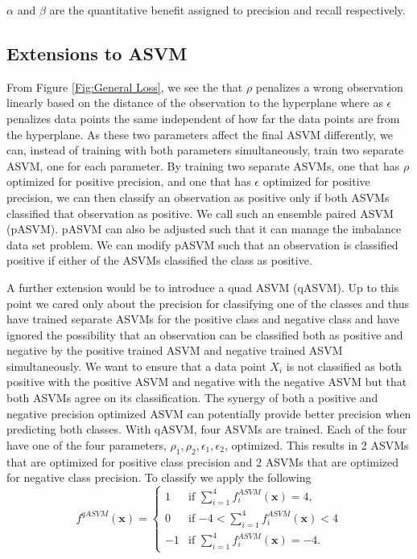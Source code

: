 \documentclass[twoside,11pt]{article}
\begin{document}
$\alpha$ and $\beta$ are the quantitative benefit assigned to precision and recall respectively. 

\subsection{Extensions to ASVM}
From Figure \ref{Fig:General Loss}, we see the that $\rho$ penalizes a wrong observation linearly based on the distance of the observation to the hyperplane where as $\epsilon$ penalizes data points the same independent of how far the data points are from the hyperplane. As these two parameters affect the final ASVM differently, we can, instead of training with both parameters simultaneously, train two separate ASVM, one for each parameter. By training two separate ASVMs, one that has $\rho$ optimized for positive precision, and one that has $\epsilon$ optimized for positive precision, we can then classify an observation as positive only if both ASVMs classified that observation as positive. We call such an ensemble paired ASVM (pASVM). pASVM can also be adjusted such that it can manage the imbalance data set problem. We can modify pASVM such that an observation is classified positive if either of the ASVMs classified the class as positive. 

A further extension would be to introduce a quad ASVM (qASVM). Up to this point we cared only about the precision for classifying one of the classes and thus have trained separate ASVMs for the positive class and negative class and have ignored the possibility that an observation can be classified both as positive and negative by the positive trained ASVM and negative trained ASVM simultaneously. We want to ensure that a data point $X_i$ is not classified as both positive with the positive ASVM and negative with the negative ASVM but that both ASVMs agree on its classification. The synergy of both a positive and negative precision optimized ASVM can potentially provide better precision when predicting both classes. With qASVM, four ASVMs are trained. Each of the four have one of the four parameters, $\rho_1,\rho_2,\epsilon_1,\epsilon_2$, optimized. This results in 2 ASVMs that are optimized for positive class precision and 2 ASVMs that are optimized for negative class precision. To classify we apply the following
\begin{equation}
	f^{qASVM}(\mathbf{x})=\begin{cases} 1 & \text{if $\sum_{i=1}^4 f^{ASVM}_i(\mathbf{x}) = 4$,}
\\
0 & \text{if $-4 <\sum_{i=1}^4 f^{ASVM}_i(\mathbf{x})<4$}\\
 -1  &\text{if $\sum_{i=1}^4 f^{ASVM}_i(\mathbf{x})=-4$.}
	\end{cases}
\end{equation}
\end{document}
